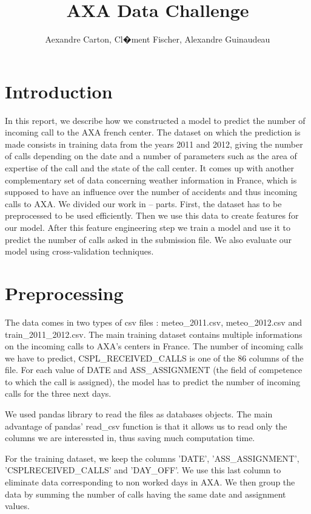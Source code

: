 \documentclass[english]{article}
\begin{document}
\title{AXA Data Challenge}


\author{Aexandre Carton, Cl�ment Fischer, Alexandre Guinaudeau}

\maketitle

\section{Introduction}

In this report, we describe how we constructed a model to predict
the number of incoming call to the AXA french center. The dataset
on which the prediction is made consists in training data from the
years 2011 and 2012, giving the number of calls depending on the date
and a number of parameters such as the area of expertise of the call
and the state of the call center. It comes up with another complementary
set of data concerning weather information in France, which is supposed
to have an influence over the number of accidents and thus incoming
calls to AXA. We divided our work in -- parts. First, the dataset
has to be preprocessed to be used efficiently. Then we use this data
to create features for our model. After this feature engineering step
we train a model and use it to predict the number of calls asked in
the submission file. We also evaluate our model using cross-validation
techniques.


\section{Preprocessing}

The data comes in two types of csv files : meteo\_2011.csv, meteo\_2012.csv
and train\_2011\_2012.csv. The main training dataset contains multiple
informations on the incoming calls to AXA's centers in France. The
number of incoming calls we have to predict, CSPL\_RECEIVED\_CALLS
is one of the 86 columns of the file. For each value of DATE and ASS\_ASSIGNMENT
(the field of competence to which the call is assigned), the model
has to predict the number of incoming calls for the three next days.

We used pandas library to read the files as databases objects. The
main advantage of pandas' read\_csv function is that it allows us
to read only the columns we are interessted in, thus saving much computation
time. 

For the training dataset, we keep the columns 'DATE', 'ASS\_ASSIGNMENT',
'CSPLRECEIVED\_CALLS' and 'DAY\_OFF'. We use this last column to eliminate
data corresponding to non worked days in AXA. We then group the data
by summing the number of calls having the same date and assignment
values. 
\end{document}
